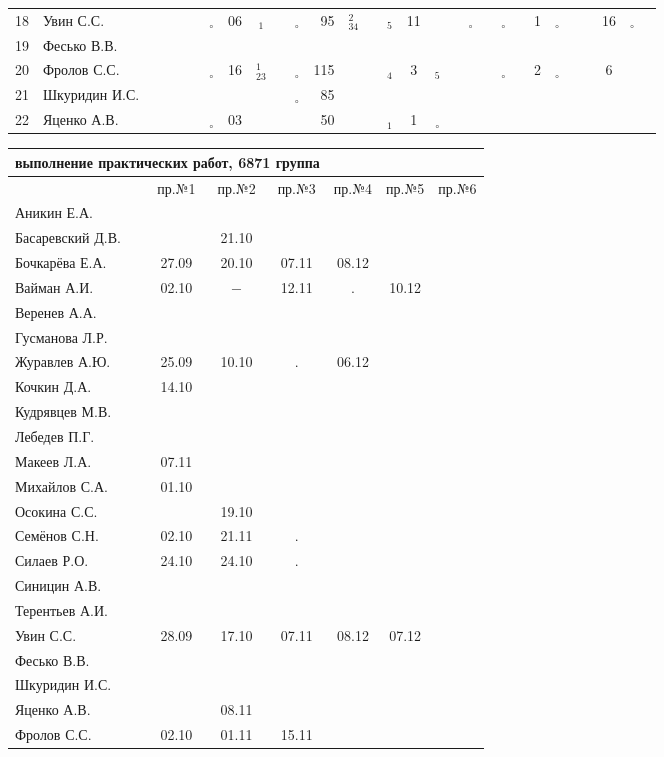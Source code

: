 \documentclass[a4paper,landscape,11pt]{article}
\newcommand*\OK{&\small \ding{51}$\!\!_\circ$} %
\newcommand*\Ok{&\small \ding{51}$\!\!_\circ$} %
\newcommand*\ok{&{\small \ding{51}}} %
\newcommand*\no{&{\small }} %
\newcommand*\da{&{\small\ding{48}$\!\!_1$}} %
\newcommand*\ac{&{\small\ding{48}$\!\!^1_{23}$}} %
\newcommand*\dd{&{\small\ding{48}$\!\!_4$}} %
\newcommand*\bd{&{\small\ding{48}$\!\!^2_{34}$}} %
\newcommand*\de{&{\small\ding{48}$\!\!_5$}} %
\begin{document}
\begin{tabular}{l|l|cccccccccrccccccccccccccccc}
18&Увин С.С.       \ok\ok\ok\ok\OK&06\da\ok\OK& 95\bd\ok\de& 11\ok\ok\Ok\ok\Ok\ok& 1\Ok\ok\ok&16\Ok\ok\\
19&Фесько В.В.     \no\no\no\no\no\no\no\no\no \no\no\no\no \no\no\no\no\no\no\no\no\no\no\no\no\no\no\\
20&Фролов С.С.     \ok\ok\ok\ok\OK&16\ac\ok\OK&115\ok\ok\dd&  3\de\ok\ok\ok\Ok\no& 2\Ok\ok\ok& 6\ok\ok\\ 
21&Шкуридин И.С.   \ok\ok\ok\ok\ok\no\ok\ok\OK& 85\ok\ok\no \no\ok\no\no\no\no\ok\no\no\no\no\no\no\no\\
22&Яценко А.В.     \ok\ok\ok\ok\OK&03\ok\ok\ok& 50\ok\ok\da&  1\Ok\no\no\no\no\ok\no\no\no\no\no\no\no\\ 
\bottomrule
\end{tabular} 
\newpage

\begin{tabular}{l|cccccc}
\multicolumn{4}{c}{выполнение практических работ, 6871 группа} \\
\toprule
                &пр.№1&пр.№2&пр.№3&пр.№4&пр.№5&  пр.№6\\
\midrule
Аникин Е.А.     &     &     &     &     &     &\\    
Басаревский Д.В.&     &21.10&     &     &     &\\
Бочкарёва Е.А.  &27.09&20.10&07.11&08.12&     &\\
Вайман А.И.     &02.10&$-$  &12.11&  .  &10.12&\\
Веренев А.А.    &     &     &     &     &     &\\
Гусманова Л.Р.  &     &     &     &     &     &\\
Журавлев А.Ю.   &25.09&10.10&  .  &06.12&     &\\
Кочкин Д.А.     &14.10&     &     &     &     &\\
Кудрявцев М.В.  &     &     &     &     &     &\\
Лебедев П.Г.    &     &     &     &     &     &\\
Макеев Л.А.     &07.11&     &     &     &     &\\
Михайлов С.А.   &01.10&     &     &     &     &\\
Осокина С.С.    &     &19.10&     &     &     &\\
Семёнов С.Н.    &02.10&21.11&  .  &     &     &\\
Силаев Р.О.     &24.10&24.10&  .  &     &     &\\
Синицин А.В.    &     &     &     &     &     &\\
Терентьев А.И.  &     &     &     &     &     &\\
Увин С.С.       &28.09&17.10&07.11&08.12&07.12&\\
Фесько В.В.     &     &     &     &     &     &\\
Шкуридин И.С.   &     &     &     &     &     &\\
Яценко А.В.     &     &08.11&     &     &     &\\
Фролов С.С.     &02.10&01.11&15.11&     &     &\\
\bottomrule
\end{tabular}
\end{document}
